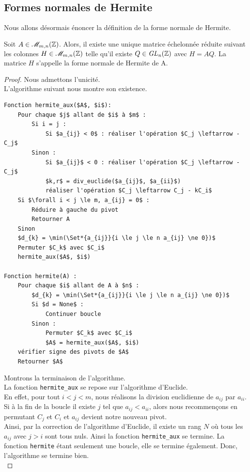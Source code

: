 \documentclass[12pt]{article}
\begin{document}
\subsection{Formes normales de Hermite}
Nous allons désormais énoncer la définition de la forme normale de Hermite.
\begin{definition}
	Soit $A \in \mathscr{M}_{m,n}(\mathbb Z)$. Alors, il existe une unique matrice échelonnée
	réduite suivant les colonnes $H \in \mathscr{M}_{m,n}(\mathbb Z)$ telle qu'il existe $Q \in \it {GL}_n(\mathbb Z)$
	avec $H = AQ$. La matrice $H$ s'appelle la forme normale de Hermite de A.
\end{definition}

\begin{proof}
	Nous admettons l'unicité.\\
	L'algorithme suivant nous montre son existence.
	\begin{lstlisting}
Fonction hermite_aux($A$, $i$):
	Pour chaque $j$ allant de $i$ à $m$ :
		Si i = j :
			Si $a_{ij} < 0$ : réaliser l'opération $C_j \leftarrow -C_j$
		Sinon :
			Si $a_{ij}$ < 0 : réaliser l'opération $C_j \leftarrow -C_j$
			$k,r$ = div_euclide($a_{ij}$, $a_{ii}$)
			réaliser l'opération $C_j \leftarrow C_j - kC_i$
	Si $\forall i < j \le m, a_{ij} = 0$ :
		Réduire à gauche du pivot
		Retourner A
	Sinon
	$d_{k} = \min(\Set*{a_{ij}}{i \le j \le n a_{ij} \ne 0})$
	Permuter $C_k$ avec $C_i$
	hermite_aux($A$, $i$)

Fonction hermite(A) :
	Pour chaque $i$ allant de A à $n$ :
		$d_{k} = \min(\Set*{a_{ij}}{i \le j \le n a_{ij} \ne 0})$
		Si $d = None$ :
			Continuer boucle
		Sinon :
			Permuter $C_k$ avec $C_i$
			$A$ = hermite_aux($A$, $i$)
	vérifier signe des pivots de $A$
	Retourner $A$

\end{lstlisting}
	\newpage\noindent
	Montrons la terminaison de l'algorithme.\\
	La fonction \texttt{hermite\_aux} se repose sur l'algorithme d'Euclide.\\
	En effet, pour tout $i < j < m$, nous réalisons la division euclidienne de $a_{ij}$ par $a_{ii}$.\\
	Si à la fin de la boucle il existe $j$ tel que $a_{ij} < a_{ii}$, alors nous recommençons
	en permutant $C_j$ et $C_i$ et $a_{ij}$ devient	notre nouveau pivot.\\
	Ainsi, par la correction de l'algorithme d'Euclide, il existe un rang $N$ où tous les
	$a_{ij}$ avec $j> i$ sont tous nuls. Ainsi la fonction \texttt{hermite\_aux} se termine.
	La fonction \texttt{hermite} étant	seulement une boucle, elle se termine également.
	Donc, l'algorithme se termine bien.\\


\end{proof}
\end{document}

